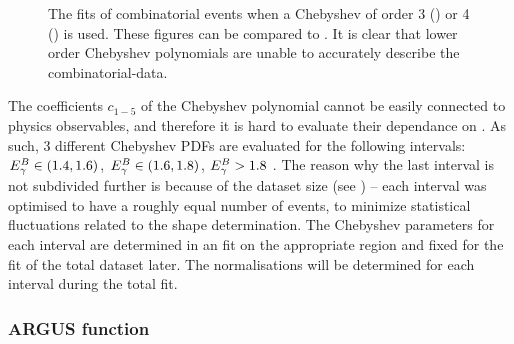 \begin{figure}[htbp!]
    \caption{\label{fig:lower_order_chebyshev}The \Mbc fits of combinatorial \BB events when a Chebyshev \PDF of order 3 () or 4 () is used.
    These figures can be compared to .
    It is clear that lower order Chebyshev polynomials are unable to accurately describe the combinatorial-\BB data.
    }
\end{figure}


The coefficients $c_{1-5}$ of the Chebyshev polynomial cannot be easily connected to physics observables,
and therefore it is hard to evaluate their dependance on \EB.
As such, 3 different Chebyshev PDFs are evaluated for the following intervals: ${E^B_{\gamma}}\in(1.4,1.6)$, ${E^B_{\gamma}}\in(1.6,1.8)$, ${E^B_{\gamma}}>1.8$ \gev.
The reason why the last interval is not subdivided further is because of the dataset size (see ) -- each interval was optimised to have a roughly equal number of events, to minimize statistical fluctuations related to the shape determination.
The Chebyshev \PDF parameters for each interval are determined in an \Mbc fit on the appropriate region and fixed for the fit of the total dataset later.
The normalisations will be determined for each \EB interval during the total fit.

\subsubsection{ARGUS function}\label{sec:argus_prefit}


